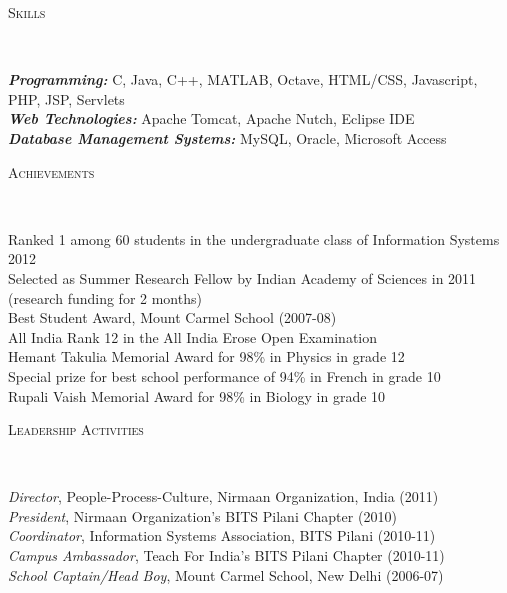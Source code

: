 \documentclass[9pt]{article}
\newenvironment{changemargin}[2]{%
  \begin{list}{}{%
    \setlength{\topsep}{0pt}%
    \setlength{\leftmargin}{#1}%
    \setlength{\rightmargin}{#2}%
    \setlength{\listparindent}{\parindent}%
    \setlength{\itemindent}{\parindent}%
    \setlength{\parsep}{\parskip}%
  }%
  \item[]}{\end{list}
}
\newcommand{\lineover}{
	\begin{changemargin}{-0.05in}{-0.05in}
		\vspace*{-8pt}
		\hrulefill \\
		\vspace*{-2pt}
	\end{changemargin}
}
\newcommand{\header}[1]{
	\begin{changemargin}{-0.5in}{-0.5in}
		\scshape{#1}\\
  	\lineover
	\end{changemargin}
}
\newenvironment{body} {
	\vspace*{-16pt}
	\begin{changemargin}{-0.25in}{-0.5in}
  }	
	{\end{changemargin}
}
\begin{document}
\smallskip

\header{Skills}

\begin{body}
	\vspace{14pt}
	\emph{\textbf{Programming:}}{} C, Java, C++, MATLAB, Octave, HTML/CSS, Javascript, PHP, JSP, Servlets \\
	\medskip
	\emph{\textbf{Web Technologies:}}{} Apache Tomcat, Apache Nutch, Eclipse IDE \\
	\medskip
	\emph{\textbf{Database Management Systems:}}{} MySQL, Oracle, Microsoft Access
\end{body}

\smallskip

\header{Achievements}

\begin{body}
	\vspace{14pt}
	Ranked 1 among 60 students in the undergraduate class of Information Systems 2012 \\
	Selected as Summer Research Fellow by Indian Academy of Sciences in 2011 (research funding for 2 months) \\
	Best Student Award, Mount Carmel School (2007-08) \\
	All India Rank 12 in the All India Erose Open Examination \\
	Hemant Takulia Memorial Award for 98\% in Physics in grade 12 \\
	Special prize for best school performance of 94\% in French in grade 10 \\
	Rupali Vaish Memorial Award for 98\% in Biology in grade 10 \\
\end{body}

\smallskip


\header{Leadership Activities}

\begin{body}
	\vspace{14pt}
	\emph{Director}, People-Process-Culture, Nirmaan Organization, India (2011) \\
	\emph{President}, Nirmaan Organization’s BITS Pilani Chapter (2010) \\
	\emph{Coordinator}, Information Systems Association, BITS Pilani (2010-11) \\
	\emph{Campus Ambassador}, Teach For India’s BITS Pilani Chapter (2010-11) \\
	\emph{School Captain/Head Boy}, Mount Carmel School, New Delhi (2006-07) \\
\end{body}
\end{document}
